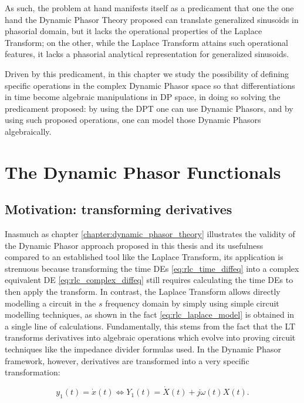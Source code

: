 	As such, the problem at hand manifests itself as a predicament that one the one hand the Dynamic Phasor Theory proposed can translate generalized sinusoids in phasorial domain, but it lacks the operational properties of the Laplace Transform; on the other, while the Laplace Transform attains such operational features, it lacks a phasorial analytical representation for generalized sinusoids.

	Driven by this predicament, in this chapter we study the possibility of defining specific operations in the complex Dynamic Phasor space so that differentiations in time become algebraic manipulations in DP space, in doing so solving the predicament proposed: by using the DPT one can use Dynamic Phasors, and by using such proposed operations, one can model those Dynamic Phasors algebraically.

\section{The Dynamic Phasor Functionals} \label{sec:operator} %

\subsection{Motivation: transforming derivatives} \label{subsec:motivation_dpos} %

	Inasmuch as chapter \ref{chapter:dynamic_phasor_theory} illustrates the validity of the Dynamic Phasor approach proposed in this thesis and its usefulness compared to an established tool like the Laplace Transform, its application is strenuous because transforming the time DEs \eqref{eq:rlc_time_diffeq} into a complex equivalent DE \eqref{eq:rlc_complex_diffeq} still requires calculating the time DEs to then apply the transform. In contrast, the Laplace Transform allows directly modelling a circuit in the $s$ frequency domain by simply using simple circuit modelling techniques, as shown in the fact \eqref{eq:rlc_laplace_model} is obtained in a single line of calculations. Fundamentally, this stems from the fact that the LT transforms derivatives into algebraic operations which evolve into proving circuit techniques like the impedance divider formulas used. In the Dynamic Phasor framework, however, derivatives are transformed into a very specific transformation:

\begin{equation} y_1(t) = \dot{x}(t) \Leftrightarrow Y_1(t) = \dot{X}(t) + j\omega(t) X(t) .\label{eq:first_operator}\end{equation}

